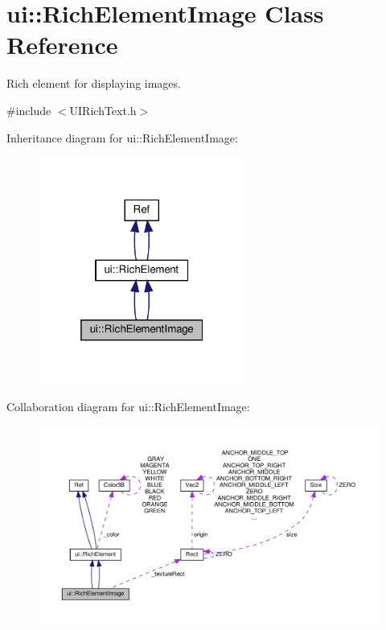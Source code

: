 \hypertarget{classui_1_1RichElementImage}{}\section{ui\+:\+:Rich\+Element\+Image Class Reference}
\label{classui_1_1RichElementImage}


Rich element for displaying images.  




{\ttfamily \#include $<$U\+I\+Rich\+Text.\+h$>$}



Inheritance diagram for ui\+:\+:Rich\+Element\+Image\+:
\nopagebreak
\begin{figure}[H]
\begin{center}
\leavevmode
\includegraphics[width=193pt]{classui_1_1RichElementImage__inherit__graph}
\end{center}
\end{figure}


Collaboration diagram for ui\+:\+:Rich\+Element\+Image\+:
\nopagebreak
\begin{figure}[H]
\begin{center}
\leavevmode
\includegraphics[width=350pt]{classui_1_1RichElementImage__coll__graph}
\end{center}
\end{figure}
